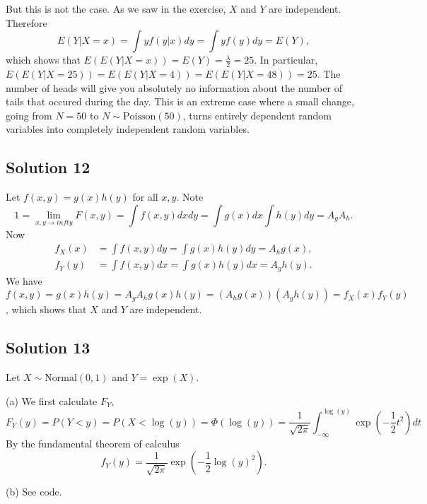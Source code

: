 But this is not the case.
As we saw in the exercise, $X$ and $Y$ are independent.
Therefore
$$
E(Y | X = x) = \int y f(y|x) dy = \int y f(y) dy = E(Y),
$$
which shows that $E(E(Y | X = x)) = E(Y) = \frac{\lambda}{2} = 25$.
In particular, $E(E(Y | X = 25)) = E(E(Y | X = 4)) = E(E(Y | X = 48)) = 25$.
The number of heads will give you absolutely no information about the number of tails that occured during the day.
This is an extreme case where a small change, going from $N = 50$ to $N \sim \mathrm{Poisson}(50)$, turns entirely dependent random variables into completely independent random variables.


\subsection*{Solution 12}

Let $f(x, y) = g(x) h(y)$ for all $x, y$.
Note
$$
1 = \lim_{x, y \to infty} F(x, y) = \int f(x, y) dx dy = \int g(x) dx \int h(y) dy = A_g A_h.
$$
Now
\begin{equation*}
    \begin{split}
        f_X(x) &= \int f(x, y) dy = \int g(x) h(y) dy = A_h g(x), \\
        f_Y(y) &= \int f(x, y) dx = \int g(x) h(y) dx = A_g h(y).
    \end{split}
\end{equation*}
We have $f(x, y) = g(x) h(y) = A_g A_h g(x) h(y) = (A_h g(x))(A_g h(y)) = f_X(x) f_Y(y)$, which shows that $X$ and $Y$ are independent.


\subsection*{Solution 13}

Let $X \sim \mathrm{Normal}(0, 1)$ and $Y = \exp(X)$.

(a) We first calculate $F_Y$,
\begin{equation*}
F_Y(y) = P(Y < y)
    = P(X < \log(y))
    = \Phi(\log(y))
    = \frac{1}{\sqrt{2\pi}} \int_{-\infty}^{\log(y)} \exp\left(-\frac{1}{2} t^2\right) dt
\end{equation*}
By the fundamental theorem of calculus
$$
f_Y(y) = \frac{1}{\sqrt{2\pi}} \exp\left(-\frac{1}{2} \log(y)^2\right).
$$

(b) See code.

